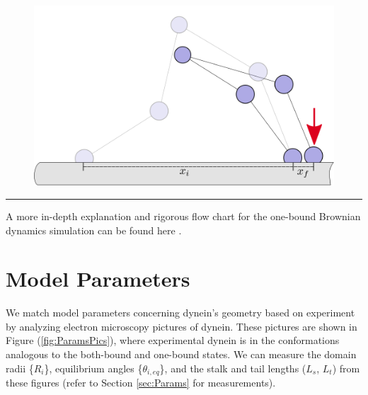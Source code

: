 \begin{figure}[H]
\centering
\includegraphics[width=0.7\columnwidth]{Figures/montecarlo6.png}
\label{fig:mc4}
\end{figure}

\noindent\rule{16.5cm}{0.4pt}

A more in-depth explanation and rigorous flow chart for the one-bound Brownian dynamics simulation can be found here \cite{waczak2019drunken}.



\section{Model Parameters}

We match model parameters concerning dynein's geometry based on experiment by analyzing electron microscopy pictures of dynein. These pictures are shown in Figure (\ref{fig:ParamsPics}), where experimental dynein is in the conformations analogous to the both-bound and one-bound states. We can measure the domain radii \{$R_i$\}, equilibrium angles \{$\theta_{i,eq}$\}, and the stalk and tail lengths ($L_s$, $L_t$) from these figures (refer to Section \ref{sec:Params} for measurements).  

